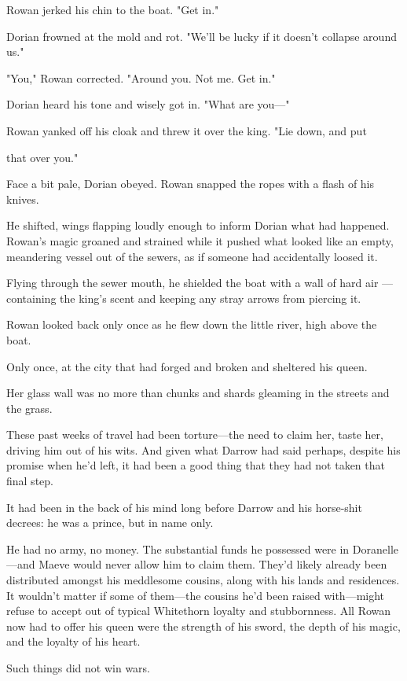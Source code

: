 Rowan jerked his chin to the boat. "Get in."

Dorian frowned at the mold and rot. "We'll be lucky if it doesn't collapse around us."

"You," Rowan corrected. "Around you. Not me. Get in."

Dorian heard his tone and wisely got in. "What are you---"

Rowan yanked off his cloak and threw it over the king. "Lie down, and put

that over you."

Face a bit pale, Dorian obeyed. Rowan snapped the ropes with a flash of his knives.

He shifted, wings flapping loudly enough to inform Dorian what had happened. Rowan's magic groaned and strained while it pushed what looked like an empty, meandering vessel out of the sewers, as if someone had accidentally loosed it.

Flying through the sewer mouth, he shielded the boat with a wall of hard air ---containing the king's scent and keeping any stray arrows from piercing it.

Rowan looked back only once as he flew down the little river, high above the boat.

Only once, at the city that had forged and broken and sheltered his queen.

Her glass wall was no more than chunks and shards gleaming in the streets and the grass.

These past weeks of travel had been torture---the need to claim her, taste her, driving him out of his wits. And given what Darrow had said
 perhaps, despite his promise when he'd left, it had been a good thing that they had not taken that final step.

It had been in the back of his mind long before Darrow and his horse-shit decrees: he was a prince, but in name only.

He had no army, no money. The substantial funds he possessed were in Doranelle---and Maeve would never allow him to claim them. They'd likely already been distributed amongst his meddlesome cousins, along with his lands and residences. It wouldn't matter if some of them---the cousins he'd been raised with---might refuse to accept out of typical Whitethorn loyalty and stubbornness. All Rowan now had to offer his queen were the strength of his sword, the depth of his magic, and the loyalty of his heart.

Such things did not win wars.

